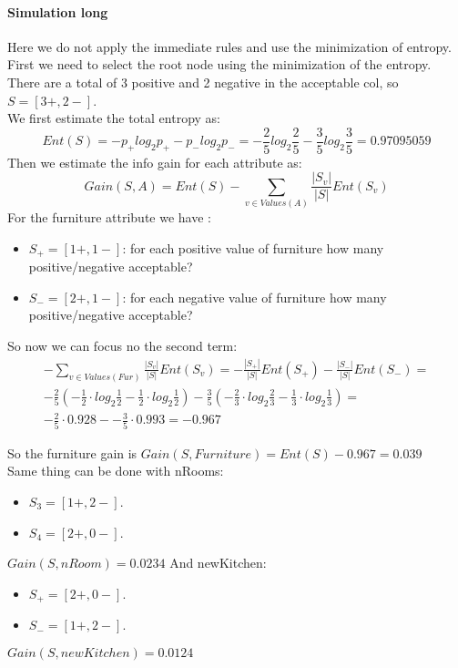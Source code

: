 \paragraph{Simulation long}
Here we do not apply the immediate rules and use the minimization of entropy.\\

First we need to select the root node using the minimization of the entropy.\\
There are a total of 3 positive and 2 negative in the acceptable col, so $S=[3+,2-]$.\\
We first estimate the total entropy as:
$$Ent(S)=-p_+log_2p_+ -p_- log_2p_-=-\frac{2}{5}log_2\frac{2}{5}-\frac{3}{5}log_2\frac{3}{5}=0.97095059$$
Then we estimate the info gain for each attribute as:
$$Gain(S,A)=Ent(S)-\sum_{v \in Values(A)}\frac{|S_v|}{|S|}Ent(S_v)$$
For the furniture attribute we have :
\begin{itemize}
\item $S_+=[1+,1-]$: for each positive value of furniture how many positive/negative acceptable?
\item $S_-=[2+,1-]$: for each negative value of furniture how many positive/negative acceptable?
\end{itemize}
So now we can focus no the second term:
\begin{equation}
\begin{aligned}
-\sum_{v \in Values(Fur)}\frac{|S_v|}{|S|}Ent(S_v)=-\frac{|S_+|}{|S|}Ent(S_+)-\frac{|S_-|}{|S|}Ent(S_-)= \\
-\frac{2}{5}(-\frac{1}{2}\cdot log_2\frac{1}{2}-\frac{1}{2}\cdot log_2\frac{1}{2})-\frac{3}{5}(-\frac{2}{3}\cdot log_2\frac{2}{3}-\frac{1}{3}\cdot log_2\frac{1}{3})=\\
-\frac{2}{5}\cdot 0.928 - -\frac{3}{5}\cdot 0.993=-0.967
\end{aligned}
\end{equation}

So the furniture gain is $Gain(S,Furniture)=Ent(S)-0.967=0.039$\\

Same thing can be done with nRooms:
\begin{itemize}
\item $S_3=[1+,2-]$.
\item $S_4=[2+,0-]$. 
\end{itemize}
$Gain(S,nRoom)=0.0234$
And newKitchen:
\begin{itemize}
\item $S_+=[2+,0-]$.
\item $S_-=[1+,2-]$. 
\end{itemize}
$Gain(S,newKitchen)=0.0124$

